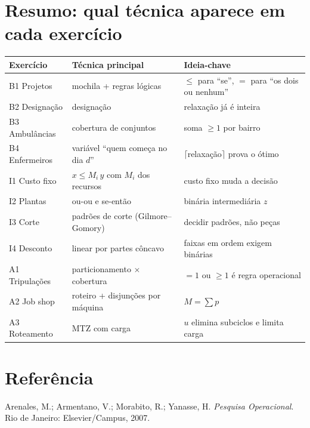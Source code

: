 \documentclass[11pt,a4paper]{article}
\begin{document}
\section*{Resumo: qual técnica aparece em cada exercício}
\begin{center}
\begin{tabular}{>{\raggedright}p{3.2cm}>{\raggedright}p{6.2cm}>{\raggedright\arraybackslash}p{4.8cm}}
\toprule
Exercício & Técnica principal & Ideia-chave\\
\midrule
B1 Projetos & mochila + regras lógicas & $\le$ para ``se'', $=$ para ``os dois ou nenhum''\\
B2 Designação & designação & relaxação já é inteira\\
B3 Ambulâncias & cobertura de conjuntos & soma $\ge1$ por bairro\\
B4 Enfermeiros & variável ``quem começa no dia $d$'' & $\lceil$relaxação$\rceil$ prova o ótimo\\
I1 Custo fixo & $x\le M_i\,y$ com $M_i$ dos recursos & custo fixo muda a decisão\\
I2 Plantas & ou-ou e se-então & binária intermediária $z$\\
I3 Corte & padrões de corte (Gilmore--Gomory) & decidir padrões, não peças\\
I4 Desconto & linear por partes côncavo & faixas em ordem exigem binárias\\
A1 Tripulações & particionamento $\times$ cobertura & $=1$ ou $\ge1$ é regra operacional\\
A2 Job shop & roteiro + disjunções por máquina & $M=\sum p$\\
A3 Roteamento & MTZ com carga & $u$ elimina subciclos e limita carga\\
\bottomrule
\end{tabular}
\end{center}

\section*{Referência}
Arenales, M.; Armentano, V.; Morabito, R.; Yanasse, H. \emph{Pesquisa Operacional}. Rio de Janeiro: Elsevier/Campus, 2007.
\end{document}
